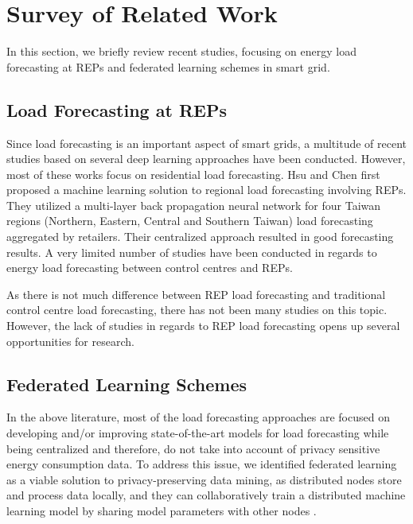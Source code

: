 \documentclass[10pt, conference]{IEEEtran}
\begin{document}
\section{Survey of Related Work}
\label{Sec: survey}
In this section, we briefly review recent studies, focusing on energy load forecasting at REPs and federated learning schemes in smart grid.

\subsection{Load Forecasting at REPs}

Since load forecasting is an important aspect of smart grids, a multitude of recent studies \cite{Zhang_Chen_Yan_Zhang_Xu_2021, Aslam_Herodotou_Mohsin_Javaid_Ashraf_Aslam_2021, 9624274} based on several deep learning approaches have been conducted. However, most of these works focus on residential load forecasting. Hsu and Chen \cite{Hsu_Chen_2003} first proposed a machine learning solution to regional load forecasting involving REPs. They utilized a multi-layer back propagation neural network for four Taiwan regions (Northern, Eastern, Central and Southern Taiwan) load forecasting aggregated by retailers. Their centralized approach resulted in good forecasting results. A very limited number of studies \cite{Glavan_Gradi_2019} have been conducted in regards to energy load forecasting between control centres and REPs. 

As there is not much difference between REP load forecasting and traditional  control centre load forecasting, there has not been many studies on this topic. However, the lack of studies in regards to REP load forecasting opens up several opportunities for research.


\subsection{Federated Learning Schemes}

In the above literature, most of the load forecasting approaches are focused on developing and/or improving state-of-the-art models for load forecasting while being centralized and therefore, do not take into account of privacy sensitive energy consumption data. To address this issue, we identified federated learning as a viable solution to privacy-preserving data mining, as distributed nodes store and process data locally, and they can collaboratively train a distributed machine learning model by sharing model parameters with other nodes \cite{9084352}.
\end{document}
